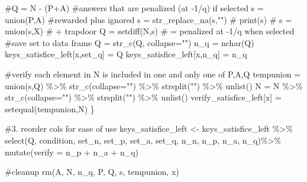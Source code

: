 \documentclass[
  letterpaper,
  DIV=11,
  numbers=noendperiod]{scrreprt}
\newenvironment{Shaded}{\begin{snugshade}}{\end{snugshade}}
\newcommand{\AttributeTok}[1]{\textcolor[rgb]{0.40,0.45,0.13}{#1}}
\newcommand{\CommentTok}[1]{\textcolor[rgb]{0.37,0.37,0.37}{#1}}
\newcommand{\FunctionTok}[1]{\textcolor[rgb]{0.28,0.35,0.67}{#1}}
\newcommand{\NormalTok}[1]{\textcolor[rgb]{0.00,0.23,0.31}{#1}}
\newcommand{\OtherTok}[1]{\textcolor[rgb]{0.00,0.23,0.31}{#1}}
\newcommand{\SpecialCharTok}[1]{\textcolor[rgb]{0.37,0.37,0.37}{#1}}
\newcommand{\StringTok}[1]{\textcolor[rgb]{0.13,0.47,0.30}{#1}}
\begin{document}
\begin{Shaded}
\begin{Highlighting}[]
  \CommentTok{\#Q = N {-} (P+A)}
  \CommentTok{\#answers that are penalized (at {-}1/q) if selected }
\NormalTok{  s }\OtherTok{=} \FunctionTok{union}\NormalTok{(P,A) }\CommentTok{\#rewarded plus ignored }
\NormalTok{  s }\OtherTok{=} \FunctionTok{str\_replace\_na}\NormalTok{(s,}\StringTok{""}\NormalTok{)}
  \CommentTok{\# print(s)}
  \CommentTok{\# s = union(s,X) \# + trapdoor }
\NormalTok{  Q }\OtherTok{=} \FunctionTok{setdiff}\NormalTok{(N,s) }\CommentTok{\# = penalized at {-}1/q when selected }
  \CommentTok{\#save set to data frame}
\NormalTok{  Q }\OtherTok{=} \FunctionTok{str\_c}\NormalTok{(Q, }\AttributeTok{collapse=}\StringTok{""}\NormalTok{)}
\NormalTok{  n\_q }\OtherTok{=} \FunctionTok{nchar}\NormalTok{(Q)}
\NormalTok{  keys\_satisfice\_left[x,}\StringTok{\textquotesingle{}set\_q\textquotesingle{}}\NormalTok{] }\OtherTok{=}\NormalTok{ Q}
\NormalTok{  keys\_satisfice\_left[x,}\StringTok{\textquotesingle{}n\_q\textquotesingle{}}\NormalTok{] }\OtherTok{=}\NormalTok{ n\_q}
  
  \CommentTok{\#verify each element in N is included in one and only one of P,A,Q}
\NormalTok{  tempunion }\OtherTok{=} \FunctionTok{union}\NormalTok{(s,Q) }\SpecialCharTok{\%\textgreater{}\%} \FunctionTok{str\_c}\NormalTok{(}\AttributeTok{collapse=}\StringTok{""}\NormalTok{) }\SpecialCharTok{\%\textgreater{}\%} \FunctionTok{strsplit}\NormalTok{(}\StringTok{""}\NormalTok{) }\SpecialCharTok{\%\textgreater{}\%} \FunctionTok{unlist}\NormalTok{()}
\NormalTok{  N }\OtherTok{=}\NormalTok{ N }\SpecialCharTok{\%\textgreater{}\%} \FunctionTok{str\_c}\NormalTok{(}\AttributeTok{collapse=}\StringTok{""}\NormalTok{) }\SpecialCharTok{\%\textgreater{}\%} \FunctionTok{strsplit}\NormalTok{(}\StringTok{""}\NormalTok{) }\SpecialCharTok{\%\textgreater{}\%} \FunctionTok{unlist}\NormalTok{()}
\NormalTok{  verify\_satisfice\_left[x] }\OtherTok{=} \FunctionTok{setequal}\NormalTok{(tempunion,N)}
\NormalTok{\}}

\CommentTok{\#3. reorder cols for ease of use}
\NormalTok{keys\_satisfice\_left }\OtherTok{\textless{}{-}}\NormalTok{ keys\_satisfice\_left }\SpecialCharTok{\%\textgreater{}\%} \FunctionTok{select}\NormalTok{(Q, condition, set\_n, set\_p, set\_a, set\_q, n\_n, n\_p, n\_a, n\_q)}\SpecialCharTok{\%\textgreater{}\%} \FunctionTok{mutate}\NormalTok{(}\AttributeTok{verify =}\NormalTok{ n\_p }\SpecialCharTok{+}\NormalTok{ n\_a }\SpecialCharTok{+}\NormalTok{ n\_q)}


\CommentTok{\#cleanup}
\FunctionTok{rm}\NormalTok{(A, N, n\_q, P, Q, s, tempunion, x)}
\end{Highlighting}
\end{Shaded}
\end{document}
